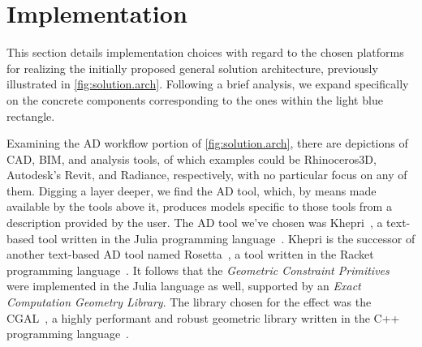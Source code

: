 \section{Implementation}%
\label{sec:solution.impl}

This section details implementation choices with regard to the chosen platforms
for realizing the initially proposed general solution architecture, previously
illustrated in \cref{fig:solution.arch}. Following a brief analysis, we expand
specifically on the concrete components corresponding to the ones within the
light blue rectangle.

Examining the \ac{AD} workflow portion of \cref{fig:solution.arch}, there are
depictions of \ac{CAD}, \ac{BIM}, and analysis tools, of which examples could be
Rhinoceros3D, Autodesk's Revit, and Radiance, respectively, with no particular
focus on any of them.  Digging a layer deeper, we find the \ac{AD} tool, which,
by means made available by the tools above it, produces models specific to those
tools from a description provided by the user.  The \ac{AD} tool we've chosen
was Khepri~\cite{Leitao:2019:GRUGEAV}, a text-based tool written in the Julia
programming language~\cite{Bezanson:2017:JAFANC}.  Khepri is the successor of
another text-based \ac{AD} tool named Rosetta~\cite{Leitao:2011:PGDCAD}, a tool
written in the Racket programming language~\cite{PLT:2010:Reference}.  It
follows that the \textit{Geometric Constraint Primitives} were implemented in
the Julia language as well, supported by an \textit{Exact Computation Geometry
Library}.  The library chosen for the effect was the
\acf{CGAL}~\cite{CGAL:2018}, a highly performant and robust geometric library
written in the C++ programming language~\cite{Stroustrup:2013:CPP}.

